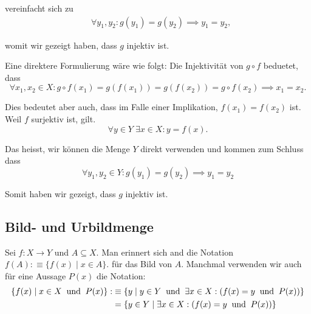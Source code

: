 \begin{imp-ex}
\begin{enumerate}[label=(\roman*)]
{      vereinfacht sich zu
      \begin{equation}
        \begin{aligned}
          &\forall y_1,y_2: g(y_1) = g(y_2) \implies y_1=y_2,
        \end{aligned}
      \end{equation}

      womit wir gezeigt haben, dass $g$ injektiv ist.

      Eine direktere Formulierung wäre wie folgt: Die Injektivität von $g \circ f$ beduetet, dass
      \begin{equation}
        \forall x_1, x_2 \in X:
        g \circ f (x_1) = g (f(x_1)) = g(f(x_2)) = g \circ f(x_2) \implies x_1 = x_2.
      \end{equation}

      Dies bedeutet aber auch, dass im Falle einer Implikation, $f(x_1) = f(x_2)$ ist. Weil $f$ surjektiv ist, gilt. \begin{equation}
        \forall y \in Y \; \exists x \in X: y = f(x).
      \end{equation}

      Das heisst, wir können die Menge $Y$ direkt verwenden und kommen zum Schluss dass
      \begin{equation}
        \forall y_1, y_2 \in Y: g(y_1) = g(y_2) \implies y_1 = y_2
      \end{equation}

      Somit haben wir gezeigt, dass $g$ injektiv ist.
    }
  \end{enumerate}
\end{imp-ex}

\subsection{Bild- und Urbildmenge}
Sei $f: X \to Y$ und $A \subseteq X$. Man erinnert sich and die Notation $f(A) :\equiv \{f(x) \mid x \in A\}.$ für das Bild von $A$. Manchmal verwenden wir auch für eine Aussage $P(x)$ die Notation:
\begin{equation}
  \label{eq: vereinfachte schreibweise}
  \begin{aligned}
    \{ f(x) \mid x \in X \;\; \text{und}\;\; P(x) \}
    : &\equiv
    \left \{ y \mid y \in Y \;\; \text{und}\;\; \exists x \in X : \left(f(x) = y \;\; \text{und}\;\; P(x) \right) \right \} \\
    &=   \left \{ y \in Y \mid  \exists x \in X : \left(f(x) = y \;\; \text{und}\;\; P(x) \right) \right \}
  \end{aligned}
\end{equation}

